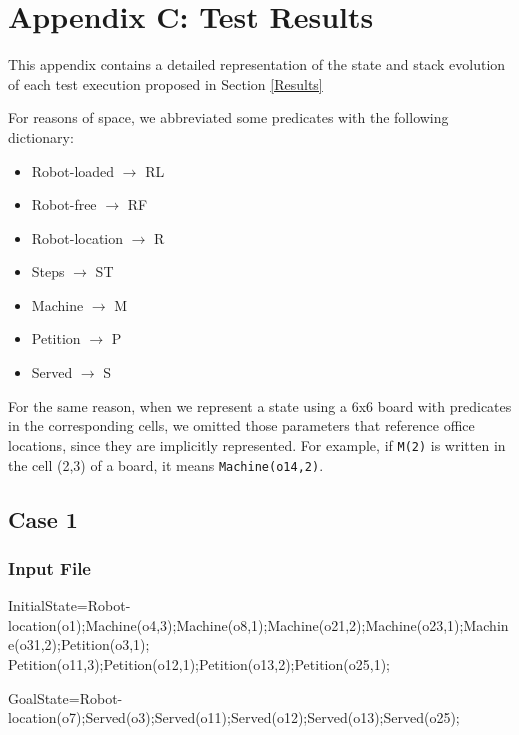 \documentclass[12pt,a4paper,oneside]{article}
\numberwithin{equation}{section}
\numberwithin{equation}{section}
\theoremstyle{definition}
\begin{document}
\newpage

\section*{Appendix C: Test Results} \label{Test Results}


This appendix contains a detailed representation of the state and stack evolution of each test execution proposed in Section \ref{Results}


For reasons of space, we abbreviated some predicates with the following dictionary:
\begin{itemize}
	\item Robot-loaded $\rightarrow$ RL
	\item Robot-free $\rightarrow$ RF
	\item Robot-location $\rightarrow$ R
	\item Steps $\rightarrow$ ST
	\item Machine $\rightarrow$ M
	\item Petition $\rightarrow$ P
	\item Served $\rightarrow$ S
\end{itemize}

For the same reason, when we represent a state using a 6x6 board with predicates in the corresponding cells, we omitted those parameters that reference office locations, since they are implicitly represented. For example, if \texttt{M(2)} is written in the cell (2,3) of a board, it means \texttt{Machine(o14,2)}.


\subsection*{Case 1}

\subsubsection*{Input File}

\begin{listing}[style=consola, numbers=none]
InitialState=Robot-location(o1);Machine(o4,3);Machine(o8,1);Machine(o21,2);Machine(o23,1);Machine(o31,2);Petition(o3,1); Petition(o11,3);Petition(o12,1);Petition(o13,2);Petition(o25,1);

GoalState=Robot-location(o7);Served(o3);Served(o11);Served(o12);Served(o13);Served(o25);
\end{listing}
\end{document}
